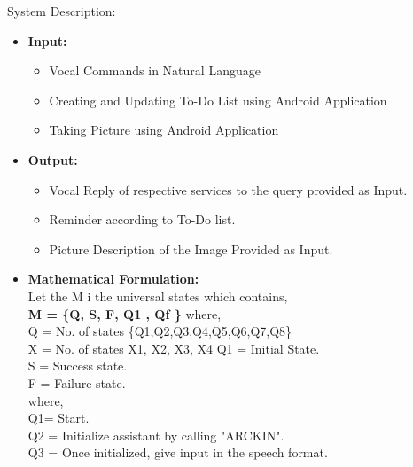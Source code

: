 \documentclass[16pt,oneside,a4paper]{article}
\begin{document}
System Description:
\begin{itemize} 
\item \textbf{Input:}	 
	\begin{itemize}
		\item Vocal Commands in Natural Language
		\item Creating and Updating To-Do List using Android Application
		\item Taking Picture using Android Application
	\end{itemize} 
\item \textbf{Output:}
	\begin{itemize}
		\item Vocal Reply of respective services to the query provided as Input.
		\item Reminder according to To-Do list.
		\item Picture Description of the Image Provided as Input.
	\end{itemize}	 
\item \textbf{Mathematical Formulation:}\\
Let the M i the universal states which contains, \\
    \textbf{M = \{Q, S, F, Q1 , Qf \}} \newline
    where, \\
    \newline
    		Q = No. of states \{Q1,Q2,Q3,Q4,Q5,Q6,Q7,Q8\}\\
    		X = No. of states {X1, X2, X3, X4}
    		Q1 = Initial State.\\
    		S = Success state.\\
    		F = Failure state.\\
    		\newline
    where,\\ 
    \newline
    Q1= Start.\\
     \newline
    Q2 = Initialize assistant by calling "ARCKIN". \\
    \newline
    Q3 = Once initialized, give input in the speech format.\\
    \newline

\end{itemize}
\end{document}
